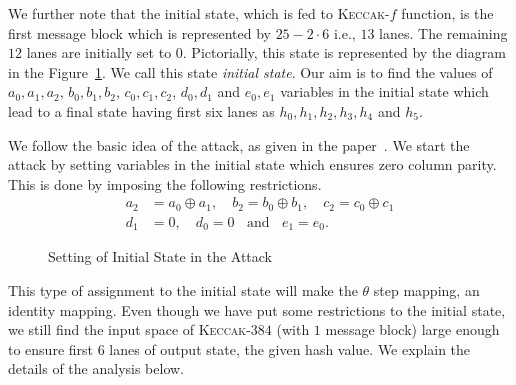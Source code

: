 \documentclass[runningheads]{llncs}
\newcommand{\Keccak}{\mbox{\textsc{Keccak}}}
\begin{document}
We further note that the initial state, which is fed to \Keccak-$f$ function, is the first message block which is represented by $25-2\cdot 6$ i.e., $13$ lanes. The remaining $12$ lanes are initially set to $0$. Pictorially, this state is represented by the diagram in the Figure~\ref{initial_state}. We call this state \emph{initial state}.
Our aim is to find the values of $a_0, a_1, a_2$, $b_0, b_1, b_2$, $c_0, c_1, c_2$, $d_0, d_1$ and $e_0, e_1$ variables in the initial state which lead to a final state having first six lanes as $h_0, h_1, h_2,h_3, h_4$ and $h_5$. 

We follow the basic idea of the attack, as given in the paper~\cite{naya2011practical}.
We start the attack by setting variables in the initial state which ensures zero column parity. 
This is done by imposing the following restrictions.
\begin{align}\nonumber
a_2 &= a_0 \oplus a_1,\quad b_2 = b_0 \oplus b_1, \quad c_2 = c_0 \oplus c_1\\ \label{cond_state1}
d_1 & = 0,\quad d_0 = 0\;\;\text{ and }\;\; e_1 = e_0. 
\end{align}

\begin{figure}
\begin{center}
\end{center}
\caption{Setting of Initial State in the Attack\label{initial_state}}
\end{figure}
This type of assignment to the initial state will make the {$\theta$} step mapping, an identity mapping. Even though we have put some restrictions to the initial state, we still find the input space of \Keccak-$384$ (with $1$ message block) large enough to ensure first $6$ lanes of output state, the given hash value. We explain the details of the analysis below. 
\end{document}
